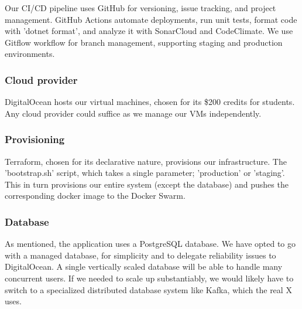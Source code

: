 Our CI/CD pipeline uses GitHub for versioning, issue tracking, and project management. GitHub Actions automate deployments, run unit tests, format code with 'dotnet format', and analyze it with SonarCloud and CodeClimate. We use Gitflow workflow for branch management, supporting staging and production environments.

\subsubsection{Cloud provider}

DigitalOcean hosts our virtual machines, chosen for its \$200 credits for students. Any cloud provider could suffice as we manage our VMs independently.

\subsubsection{Provisioning}

Terraform, chosen for its declarative nature, provisions our infrastructure. The 'bootstrap.sh' script, which takes a single parameter; 'production' or 'staging'. This in turn provisions our entire system (except the database) and pushes the corresponding docker image to the Docker Swarm.

\subsubsection{Database}
As mentioned, the application uses a PostgreSQL database. We have opted to go with a managed database, for simplicity and to delegate reliability issues to DigitalOcean. A single vertically scaled database will be able to handle many concurrent users. If we needed to scale up substantiably, we would likely have to switch to a specialized distributed database system like Kafka, which the real X uses\cite{kafka}.

